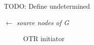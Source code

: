 \documentclass[a4paper]{article}
\newcommand{\TODO}[1]{\small\noindent\color{red} TODO: #1\color{black}}
\begin{document}
\TODO{Define undetermined}

\begin{algorithm}
    \Start $\leftarrow$ \emph{source nodes of G}\;
    \For{}
    {
    }
\end{algorithm}

\begin{landscape}
\thispagestyle{empty}
    \begin{figure}[ht]
        \centering
        \begin{dot2tex}[mathmode,scale=0.4]
            
        \end{dot2tex}
        \caption{OTR initiator}
    \end{figure}
\end{landscape}
\end{document}
